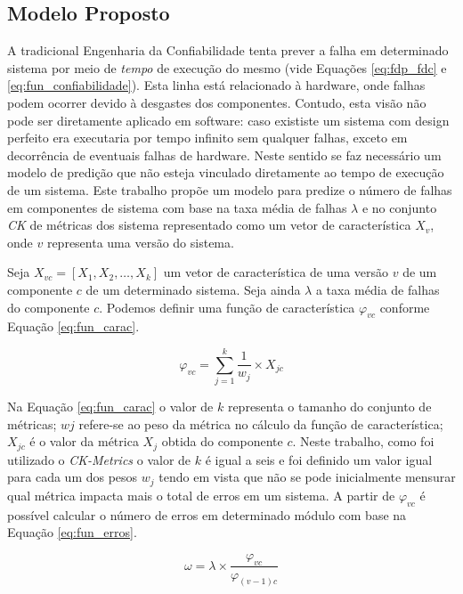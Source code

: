 \documentclass[12pt]{article}
\begin{document}
\subsection{Modelo Proposto}{}
\label{subsec:modelo}

A tradicional Engenharia da Confiabilidade tenta prever a falha em determinado
sistema por meio de \textit{tempo} de execução do mesmo (vide Equações
\ref{eq:fdp_fdc} e \ref{eq:fun_confiabilidade}). Esta linha está
relacionado à hardware, onde falhas podem ocorrer devido à desgastes dos
componentes. Contudo, esta visão não pode ser diretamente aplicado em software:
caso exististe um sistema com design perfeito era executaria por tempo infinito
sem qualquer falhas, exceto em decorrência de eventuais falhas de hardware.
Neste sentido se faz necessário um modelo de predição que não esteja vinculado
diretamente ao tempo de execução de um sistema. Este trabalho propõe um modelo
para predize o número de falhas em componentes de sistema com base na taxa média de falhas
$\lambda$ e no conjunto \textit{CK} de métricas dos sistema representado como um
vetor de característica $X_v$, onde $v$ representa uma versão do sistema.

Seja $X_{vc}=[X_1,X_2,\ldots,X_k]$ um vetor de característica de uma versão $v$ de
um componente $c$ de um determinado sistema. Seja ainda $\lambda$ a taxa média
de falhas do componente $c$. Podemos definir uma função de característica
$\varphi_{vc}$ conforme Equação \ref{eq:fun_carac}{}.

\begin{equation} \label{eq:fun_carac}
    \varphi_{vc} = \sum_{j=1}^{k} \frac{1}{w_{j}} \times X_{jc}
\end{equation}


Na Equação \ref{eq:fun_carac} o valor de $k$ representa o tamanho do conjunto de
métricas; $w{j}$ refere-se ao peso da métrica no cálculo da função de
característica; $X_{jc}$ é o valor da métrica $X_j$ obtida do componente $c$.
Neste trabalho, como foi utilizado o \textit{CK-Metrics}{} o valor de $k$ é
igual a seis e foi definido um valor igual para cada um dos pesos $w_j$ tendo em
vista que não se pode inicialmente mensurar qual métrica impacta mais o total de
erros em um sistema. A partir de $\varphi_{vc}$ é possível calcular o número de
erros em determinado módulo com base na Equação \ref{eq:fun_erros}{}.

\begin{equation} \label{eq:fun_erros}
    \omega = \lambda \times \frac{\varphi_{vc}}{\varphi_{(v-1)c}}
\end{equation}
\end{document}
